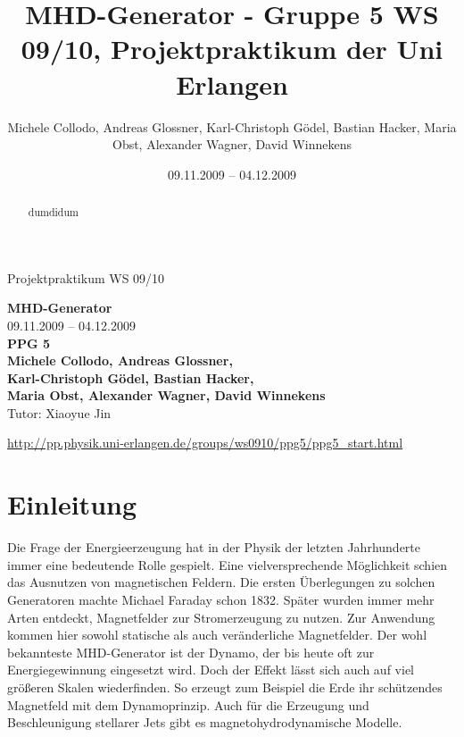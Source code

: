 \documentclass[11pt]{scrartcl}
\title{MHD-Generator - Gruppe 5 WS 09/10, Projektpraktikum der Uni Erlangen}
\date{09.11.2009 -- 04.12.2009}
\author{Michele Collodo, Andreas Glossner, Karl-Christoph G\"odel, Bastian Hacker, Maria Obst, Alexander Wagner, David Winnekens}
\begin{document}
\sloppy %
\thispagestyle{empty}
\large{Projektpraktikum WS 09/10}
\hfill
{}
\\[8\baselineskip]
\begin{center}
{\fontsize{36}{54}\textbf{MHD-Generator}}
\\[2\baselineskip]
{\Large 09.11.2009 -- 04.12.2009}
\\[7\baselineskip]
{\huge\textbf{PPG 5}}\\[0.5\baselineskip]
{\large\textbf{
Michele Collodo,
Andreas Glossner,\\
Karl-Christoph G\"odel,
Bastian Hacker,\\
Maria Obst,
Alexander Wagner,
David Winnekens}\\
Tutor: Xiaoyue Jin}
\vfill



\small{\url{http://pp.physik.uni-erlangen.de/groups/ws0910/ppg5/ppg5\_start.html}}
\end{center}
\newpage



\tableofcontents
\vfill



\begin{abstract}
dumdidum
\end{abstract}
\newpage


\section{Einleitung}	%
Die Frage der Energieerzeugung hat in der Physik der letzten Jahrhunderte immer eine bedeutende Rolle gespielt. Eine vielversprechende M\"oglichkeit schien das Ausnutzen von magnetischen Feldern. Die ersten \"Uberlegungen zu solchen Generatoren machte Michael Faraday schon 1832. Sp\"ater wurden immer mehr Arten entdeckt, Magnetfelder zur Stromerzeugung zu nutzen. Zur Anwendung kommen hier sowohl statische als auch ver\"anderliche Magnetfelder. Der wohl bekannteste MHD-Generator ist der Dynamo, der bis heute oft zur Energiegewinnung eingesetzt wird. Doch der Effekt l\"asst sich auch auf viel gr\"o\ss{}eren Skalen wiederfinden. So erzeugt zum Beispiel die Erde ihr sch\"utzendes Magnetfeld mit dem Dynamoprinzip. Auch f\"ur die Erzeugung und Beschleunigung stellarer Jets gibt es magnetohydrodynamische Modelle.
\end{document}

